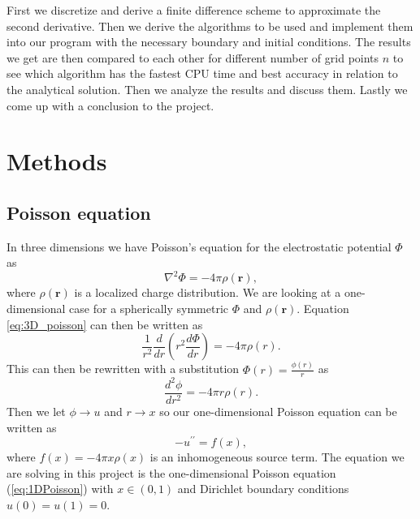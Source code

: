 \documentclass[12pt,a4paper,english]{article}
\begin{document}
First we discretize and derive a finite difference scheme to approximate the second derivative. Then we derive the algorithms to be used and implement them into our program with the necessary boundary and initial conditions. The results we get are then compared to each other for different number of grid points $n$ to see which algorithm has the fastest CPU time and best accuracy in relation to the analytical solution. Then we analyze the results and discuss them. Lastly we come up with a conclusion to the project.


\section{Methods}
\subsection{Poisson equation}
In three dimensions we have Poisson's equation for the electrostatic potential $\Phi$ as 
\begin{equation}
\label{eq:3D_poisson}
\nabla^2\Phi = -4\pi\rho(\textbf{r}),
\end{equation}
where $\rho(\textbf{r})$ is a localized charge distribution. We are looking at a one-dimensional case for a spherically symmetric $\Phi$ and $\rho(\textbf{r})$. Equation \ref{eq:3D_poisson} can then be written as 
\begin{equation}
\label{eq:1D_poisson}
\frac{1}{r^2}\frac{d}{dr}\left(r^2\frac{d\Phi}{dr}\right)=-4\pi\rho(r).
\end{equation}
This can then be rewritten with a substitution $\Phi(r)=\frac{\phi(r)}{r}$ as 
\begin{equation}
\label{eq:rewrite}
\frac{d^2\phi}{dr^2}=-4\pi r\rho(r).
\end{equation}
Then we let $\phi\rightarrow u$ and $r\rightarrow x$ so our one-dimensional Poisson equation can be written as
\begin{equation}
\label{eq:1DPoisson}
-u^{\prime\prime}=f(x),
\end{equation}
where $f(x)=-4\pi x\rho(x)$ is an inhomogeneous source term. The equation we are solving in this project is the one-dimensional Poisson equation (\ref{eq:1DPoisson}) with $x\in(0,1)$ and Dirichlet boundary conditions $u(0)=u(1)=0$.
\end{document}
